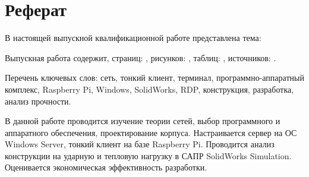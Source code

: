 \chapter*{Реферат}

В настоящей выпускной квалификационной работе представлена тема:

Выпускная работа содержит, страниц: \pageref{LastPage}, рисунков: \totalfigures,
таблиц: \totaltables, источников: .

Перечень ключевых слов: сеть, тонкий клиент, терминал, программно-аппаратный комплекс,
Raspberry Pi, Windows, SolidWorks, RDP, конструкция, разработка, анализ прочности.

В данной работе проводится изучение теории сетей, выбор программного и аппаратного
обеспечения, проектирование корпуса. Настраивается сервер на ОС Windows Server, тонкий
клиент на базе Raspberry Pi. Проводится анализ конструкции на ударную и тепловую
нагрузку в САПР SolidWorks Simulation. Оценивается экономическая эффективность
разработки.

